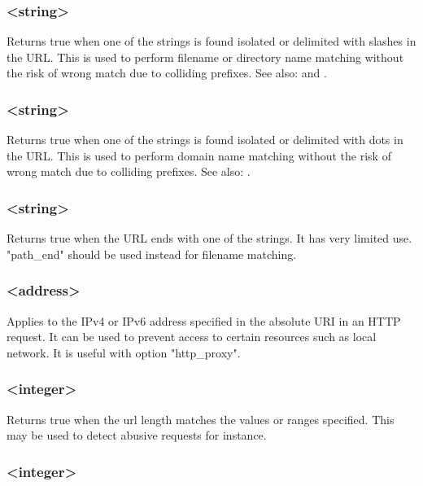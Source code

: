 \subsubsection[url\_dir]{ <string>}

  Returns true when one of the strings is found isolated or delimited with
  slashes in the URL. This is used to perform filename or directory name
  matching without the risk of wrong match due to colliding prefixes.
See also:    and .

\subsubsection[url\_dom]{ <string>}

  Returns true when one of the strings is found isolated or delimited with dots
  in the URL. This is used to perform domain name matching without the risk of
  wrong match due to colliding prefixes.
See also: .

\subsubsection[url\_end]{ <string>}

  Returns true when the URL ends with one of the strings. It has very limited
  use. "path\_end" should be used instead for filename matching.

\subsubsection[url\_ip]{ <address>}

  Applies to the IPv4 or IPv6 address specified in the absolute URI in an HTTP
  request. It can be used to prevent access to certain resources such as local
  network. It is useful with option "http\_proxy".

\subsubsection[url\_len]{ <integer>}

  Returns true when the url length matches the values or ranges specified. This
  may be used to detect abusive requests for instance.

\subsubsection[url\_port]{ <integer>}

